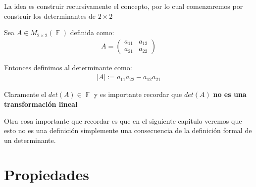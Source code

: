 \documentclass[12pt, fleqn]{report}                             %
\theoremstyle{break}                                            %
\DeclareMathOperator \GenericField {\mathbb{F}}                 %
\newcommand{\pVector}[1]                                        %
        { \ensuremath{\begin{pmatrix}#1\end{pmatrix}} }             %
\begin{document}
            La idea es construir recursivamente el concepto, por lo
            cual comenzaremos por construir los determinantes de $2 \times 2$

            Sea $A \in M_{2 \times 2}(\GenericField)$ definida como:
            \begin{align*}
                A = \pVector{a_{11} & a_{12} \\ a_{21} & a_{22}}
            \end{align*}

            Entonces definimos al determinante como:
            \begin{align*}
                |A| := a_{11} a_{22} - a_{12} a_{21} 
            \end{align*}

            Claramente el $det(A) \in \GenericField$ y es importante
            recordar que $det(A)$ \textbf{no es una transformación lineal}

            Otra cosa importante que recordar es que en el siguiente capitulo veremos
            que esto no es una definición simplemente una consecuencia de la definición
            formal de un determinante.




        \clearpage
        \section{Propiedades}
\end{document}
